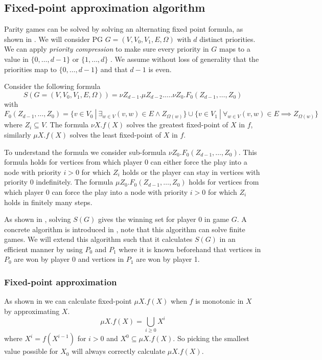 \subsection{Fixed-point approximation algorithm}
Parity games can be solved by solving an alternating fixed point formula, as shown in \cite{WALUKIEWICZ2002311}. We will consider PG $G = (V,V_0,V_1, E, \Omega)$ with $d$ distinct priorities. We can apply \textit{priority compression} to make sure every priority in $G$ maps to a value in $\{0,\dots,d-1\}$ or $\{1, \dots, d\}$ \cite{SolvingInPractice,FPITE}. We assume without loss of generality that the priorities map to $\{0,\dots,d-1\}$ and that $d-1$ is even. 

Consider the following formula
\[ S(G = (V,V_0,V_1,E,\Omega)) = \nu Z_{d-1}. \mu Z_{d-2}. \dots . \nu Z_0. F_0(Z_{d-1},\dots,Z_0) \]
with
\[ F_0(Z_{d-1},\dots,Z_0) = \{ v \in V_0\ |\ \exists_{w\in V} (v,w) \in E \wedge Z_{\Omega(w)} \} \cup \{ v \in V_1\ |\ \forall_{w\in V} (v,w) \in E \implies Z_{\Omega(w)} \} \]
where $Z_i \subseteq V$. The formula $\nu X. f(X)$ solves the greatest fixed-point of $X$ in $f$, similarly $\mu X.f(X)$ solves the least fixed-point of $X$ in $f$.

To understand the formula we consider sub-formula $\nu Z_0. F_0(Z_{d-1},\dots,Z_0)$. This formula holds for vertices from which player $0$ can either force the play into a node with priority $i > 0$ for which $Z_i$ holds or the player can stay in vertices with priority $0$ indefinitely. The formula $\mu Z_0. F_0(Z_{d-1},\dots,Z_0)$ holds for vertices from which player $0$ can force the play into a node with priority $i > 0$ for which $Z_i$ holds in finitely many steps.

As shown in \cite{WALUKIEWICZ2002311}, solving $S(G)$ gives the winning set for player $0$ in game $G$. A concrete algorithm is introduced in \cite{FPITE}, note that this algorithm can solve finite games. We will extend this algorithm such that it calculates $S(G)$ in an efficient manner by using $P_0$ and $P_1$ where it is known beforehand that vertices in $P_0$ are won by player 0 and vertices in $P_1$ are won by player 1. 

\subsubsection{Fixed-point approximation}
As shown in \cite{Emerson:1986:MCP:900378} we can calculate fixed-point $\mu X.f(X)$ when $f$ is monotonic in $X$ by approximating $X$.
\[ \mu X.f(X) = \bigcup_{i \geq 0} X^i \]
where $X^i = f(X^{i-1})$ for $i > 0$ and $X^0 \subseteq \mu X.f(X)$. So picking the smallest value possible for $X_0$ will always correctly calculate $\mu X. f(X)$.


